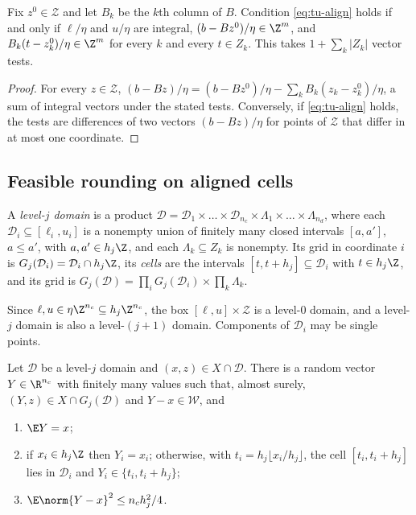 \begin{proposition}\label{prop:tu-align}
Fix $z^0\in\mathcal Z$ and let $B_k$ be the $k$th column of $B$. Condition
\eqref{eq:tu-align} holds if and only if $\ell/\eta$ and $u/\eta$ are integral,
$(b-Bz^0)/\eta\in\Z^m$, and $B_k(t-z^0_k)/\eta\in\Z^m$ for every $k$ and
every $t\in Z_k$. This takes $1+\sum_k\lvert Z_k\rvert$ vector tests.
\end{proposition}

\begin{proof}
For every $z\in\mathcal Z$,
$(b-Bz)/\eta=(b-Bz^0)/\eta-\sum_kB_k(z_k-z^0_k)/\eta$, a sum of integral
vectors under the stated tests. Conversely, if \eqref{eq:tu-align} holds, the
tests are differences of two vectors $(b-Bz)/\eta$ for points of
$\mathcal Z$ that differ in at most one coordinate.
\end{proof}

\subsection{Feasible rounding on aligned cells}\label{sec:tu-rounding}

\begin{definition}\label{def:tu-domain}
A \emph{level-$j$ domain} is a product
$\mathcal D=\mathcal D_1\times\dots\times\mathcal D_{n_c}\times\Lambda_1\times\dots\times\Lambda_{n_d}$,
where each $\mathcal D_i\subseteq[\ell_i,u_i]$ is a nonempty union of finitely
many closed intervals $[a,a']$, $a\le a'$, with $a,a'\in h_j\Z$, and each
$\Lambda_k\subseteq Z_k$ is nonempty. Its grid in coordinate $i$ is
$G_j(\mathcal D_i)=\mathcal D_i\cap h_j\Z$, its \emph{cells} are the intervals
$[t,t+h_j]\subseteq\mathcal D_i$ with $t\in h_j\Z$, and its grid is
$G_j(\mathcal D)=\prod_iG_j(\mathcal D_i)\times\prod_k\Lambda_k$.
\end{definition}

Since $\ell,u\in\eta\Z^{n_c}\subseteq h_j\Z^{n_c}$, the box
$[\ell,u]\times\mathcal Z$ is a level-$0$ domain, and a level-$j$ domain is
also a level-$(j+1)$ domain. Components of $\mathcal D_i$ may be single points.

\begin{lemma}\label{lem:tu-round}
Let $\mathcal D$ be a level-$j$ domain and $(x,z)\in X\cap\mathcal D$. There is
a random vector $Y\in\R^{n_c}$ with finitely many values such that, almost
surely, $(Y,z)\in X\cap G_j(\mathcal D)$ and $Y-x\in\mathcal W$, and
\begin{enumerate}[label=(\alph*)]
\item $\E Y=x$;
\item if $x_i\in h_j\Z$ then $Y_i=x_i$; otherwise, with
$t_i=h_j\lfloor x_i/h_j\rfloor$, the cell $[t_i,t_i+h_j]$ lies in $\mathcal D_i$
and $Y_i\in\{t_i,t_i+h_j\}$;
\item $\E\norm{Y-x}^2\le n_ch_j^2/4$.
\end{enumerate}
\end{lemma}

